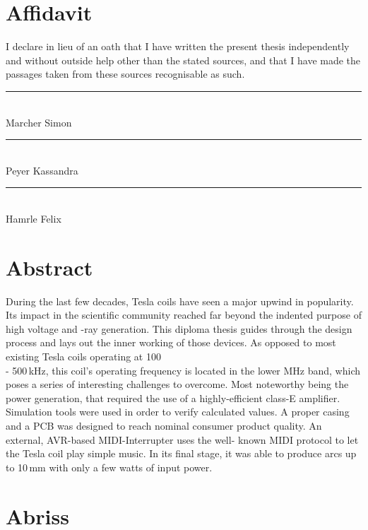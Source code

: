 \chapter*{Affidavit}

I declare in lieu of an oath that I have written the present thesis independently
and without outside help other than the stated sources, and that I have made the
passages taken from these sources recognisable as such.

\vfill

\parbox{\textwidth}{
    \parbox{4cm}{
      \centering
      \rule{4cm}{1pt}\\
       Marcher Simon
    }
    \hfill
    \parbox{4cm}{
      \centering
      \rule{4cm}{1pt}\\
      Peyer Kassandra
    }
    \hfill
    \parbox{4cm}{
      \centering
      \rule{4cm}{1pt}\\
      Hamrle Felix
    }
}

\chapter*{Abstract}

During the last few decades, Tesla coils have seen a major upwind in popularity. Its impact in the scientific community reached far beyond the indented purpose of high voltage and -ray generation. This diploma thesis guides through the design process and lays out the inner working of those devices. As opposed to most existing Tesla coils operating at 100 \\- 500\,kHz, this coil's operating frequency is located in the lower MHz band, which poses a series of interesting challenges to overcome. Most noteworthy being the power generation, that required the use of a highly-efficient class-E amplifier. Simulation tools were used \hspace{10pt}in order to verify calculated values. A proper casing and a PCB was designed to reach nominal consumer product quality. An external, AVR-based MIDI-Interrupter uses the well- known MIDI protocol to let the Tesla coil play simple music. In its final stage, it was able to produce arcs up to 10\,mm with only a few watts of input power.

\vspace{4cm}

\begingroup
\let\clearpage\relax
\chapter*{Abriss}
\endgroup


